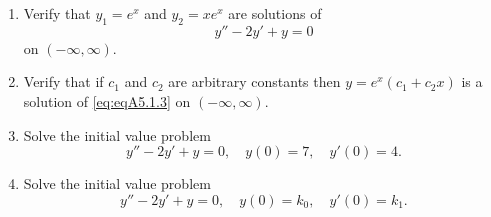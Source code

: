 \documentclass{ximera}
\begin{document}
\begin{problem}\label{exer:5.1.3}
\begin{enumerate}
\item %
Verify that $y_1=e^x$ and $y_2=xe^x$ are solutions of
\begin{equation}\label{eq:eqA5.1.3}
    y''-2y'+y=0
\end{equation}
on  $(-\infty,\infty)$.
\item %
Verify that if $c_1$ and $c_2$ are arbitrary constants then
$y=e^x(c_1+c_2x)$ is a solution of \ref{eq:eqA5.1.3} on
$(-\infty,\infty)$.
\item %
Solve the initial value problem
$$
y''-2y'+y=0,\quad  y(0)=7,\quad y'(0)=4.
$$
\item %
Solve the initial value problem
$$
y''-2y'+y=0,\quad  y(0)=k_0,\quad y'(0)=k_1.
$$
\end{enumerate}
\end{problem}
\end{document}
